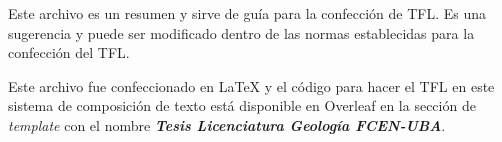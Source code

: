 Este archivo es un resumen y sirve de guía para la confección de TFL. Es una sugerencia y puede ser modificado dentro de las normas establecidas para la confección del TFL.\par
Este archivo fue confeccionado en \LaTeX{} y el código para hacer el TFL en este sistema de composición de texto está disponible en \textsf{Overleaf} en la sección de \textit{template} con el nombre \textbf{\textit{Tesis Licenciatura Geología FCEN-UBA}}.
